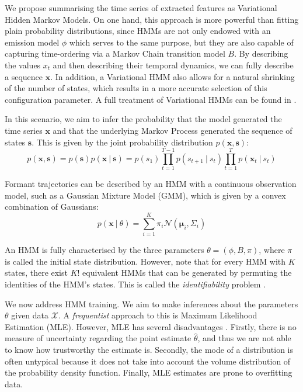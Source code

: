 \documentclass[pdftex,11pt,a4paper]{article}
\theoremstyle{definition}
\theoremstyle{remark}
\newcommand*{\V}[1]{\mathbf{#1}}%
\newcommand\given[1][]{\:#1\vert\:}
\begin{document}
We propose summarising the time series of extracted features as Variational Hidden Markov Models. On one hand, this approach is more powerful than fitting plain probability distributions, since HMMs are not only endowed with an emission model $\phi$ which serves to the same purpose, but they are also capable of capturing time-ordering via a Markov Chain transition model $B$. By describing the values $x_t$ and then describing their temporal dynamics, we can fully describe a sequence $\V{x}$. In addition, a Variational HMM also allows for a natural shrinking of the number of states, which results in a more accurate selection of this configuration parameter. A full treatment of Variational HMMs can be found in \cite{Rezek2005}.
\par In this scenario, we aim to infer the probability that the model generated the time series $\V{x}$ and that the underlying Markov Process generated the sequence of states $\V{s}$. This is given by the joint probability distribution $p(\V{x}, \V{s})$:
\begin{equation}\label{eq:hmm}
p(\V{x}, \V{s}) = p(\V{s})p(\V{x} \given \V{s}) = p(s_1)\prod_{t=1}^{T-1}p(s_{t+1}\given s_t)\prod_{t=1}^Tp(\V{x}_t \given s_t)
\end{equation} 
\par Formant trajectories can be described by an HMM with a continuous observation model, such as a Gaussian Mixture Model (GMM), which is given by a convex combination of Gaussians:
\begin{equation} \label{eq:mixmod}
p(\V{x} \given \theta ) = \sum_{i=1}^K\pi_i \mathcal{N}(\V{\mu}_i, \Sigma_i) 
\end{equation}
\par An HMM is fully characterised by the three parameters $\theta = (\phi, B, \pi)$, where $\pi$ is called the initial state distribution. However, note that for every HMM with $K$ states, there exist $K!$ equivalent HMMs that can be generated by permuting the identities of the HMM's states. This is called the \emph{identifiability} problem \cite{Bishop2006}.
\par We now address HMM training. We aim to make inferences about the parameters $\theta$ given data $\mathcal{X}$. A \emph{frequentist} approach to this is Maximum Likelihood Estimation (MLE). However, MLE has several disadvantages \cite{Murphy2012}. Firstly, there is no measure of uncertainty regarding the point estimate $\hat{\theta}$, and thus we are not able to know how trustworthy the estimate is. Secondly, the mode of a distribution is often untypical \cite{Murphy2012} because it does not take into account the volume distribution of the probability density function. Finally, MLE estimates are prone to overfitting data. 
\end{document}
